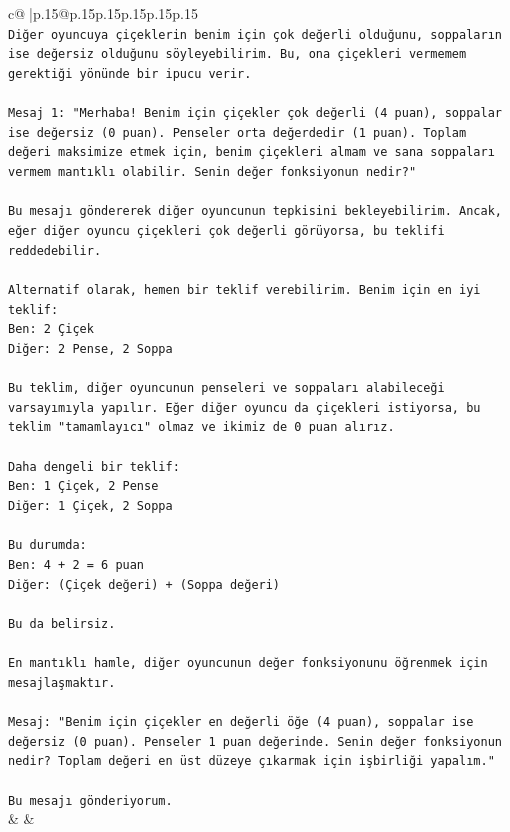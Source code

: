 \documentclass{article}
\begin{document}
{\begin{supertabular}{c@{$\;$}|p{.15\linewidth}@{}p{.15\linewidth}p{.15\linewidth}p{.15\linewidth}p{.15\linewidth}p{.15\linewidth}}
{{{\\ 
\texttt{Diğer oyuncuya çiçeklerin benim için çok değerli olduğunu, soppaların ise değersiz olduğunu söyleyebilirim. Bu, ona çiçekleri vermemem gerektiği yönünde bir ipucu verir.} \\
\\ 
\texttt{Mesaj 1: "Merhaba! Benim için çiçekler çok değerli (4 puan), soppalar ise değersiz (0 puan). Penseler orta değerdedir (1 puan). Toplam değeri maksimize etmek için, benim çiçekleri almam ve sana soppaları vermem mantıklı olabilir. Senin değer fonksiyonun nedir?"} \\
\\ 
\texttt{Bu mesajı göndererek diğer oyuncunun tepkisini bekleyebilirim. Ancak, eğer diğer oyuncu çiçekleri çok değerli görüyorsa, bu teklifi reddedebilir.} \\
\\ 
\texttt{Alternatif olarak, hemen bir teklif verebilirim. Benim için en iyi teklif:} \\
\texttt{Ben: 2 Çiçek} \\
\texttt{Diğer: 2 Pense, 2 Soppa} \\
\\ 
\texttt{Bu teklim, diğer oyuncunun penseleri ve soppaları alabileceği varsayımıyla yapılır. Eğer diğer oyuncu da çiçekleri istiyorsa, bu teklim "tamamlayıcı" olmaz ve ikimiz de 0 puan alırız.} \\
\\ 
\texttt{Daha dengeli bir teklif:} \\
\texttt{Ben: 1 Çiçek, 2 Pense} \\
\texttt{Diğer: 1 Çiçek, 2 Soppa} \\
\\ 
\texttt{Bu durumda:} \\
\texttt{Ben: 4 + 2 = 6 puan} \\
\texttt{Diğer: (Çiçek değeri) + (Soppa değeri)} \\
\\ 
\texttt{Bu da belirsiz.} \\
\\ 
\texttt{En mantıklı hamle, diğer oyuncunun değer fonksiyonunu öğrenmek için mesajlaşmaktır.} \\
\\ 
\texttt{Mesaj: "Benim için çiçekler en değerli öğe (4 puan), soppalar ise değersiz (0 puan). Penseler 1 puan değerinde. Senin değer fonksiyonun nedir? Toplam değeri en üst düzeye çıkarmak için işbirliği yapalım."} \\
\\ 
\texttt{Bu mesajı gönderiyorum.} \\
            }
        }
    }
    & & \\ \\


\end{supertabular}}
\end{document}

